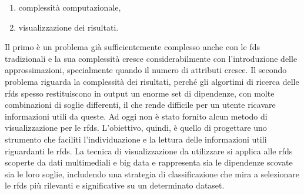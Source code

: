\begin{enumerate}
    \item complessit\`{a} computazionale,
    \item visualizzazione dei risultati.
\end{enumerate}
Il primo \`{e} un problema gi\`{a} sufficientemente complesso anche con le \acrlong{fds} tradizionali e la sua complessit\`{a} cresce considerabilmente con l'introduzione delle approssimazioni, specialmente quando il numero di attributi cresce. Il secondo problema riguarda la complessit\`{a} dei risultati, perch\'{e} gli algortimi di ricerca delle \acrlong{rfds} spesso restituiscono in output un enorme set di dipendenze, con molte combinazioni di soglie differenti, il che rende difficile per un utente ricavare informazioni utili da queste. Ad oggi non \`{e} stato fornito alcun metodo di visualizzazione per le \acrlong{rfds}. L'obiettivo, quindi, \`{e} quello di progettare uno strumento che faciliti l'individuazione e la lettura delle informazioni utili riguardanti le \acrlong{rfds}. La tecnica di visualizzazione da utilizzare si applica alle \acrlong{rfds} scoperte da dati multimediali e big data e rappresenta sia le dipendenze scovate sia le loro soglie, includendo una strategia di classificazione che mira a selezionare le \acrlong{rfds} pi\`{u} rilevanti e significative su un determinato dataset.

